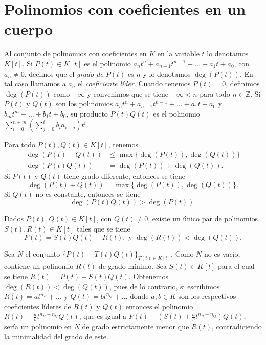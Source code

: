 \section*{Polinomios con coeficientes en un cuerpo}

\begin{defn}
Al conjunto de polinomios con coeficientes en $K$ en la variable $t$ lo denotamos $K[t]$. Si $P(t)\in K[t]$ es el polinomio $a_nt^n+a_{n-1}t^{n-1}+\ldots+a_1t+a_0$, con $a_n\ne 0$, decimos que el \emph{grado de $P(t)$} es $n$ y lo denotamos $\deg\left(P(t)\right)$. En tal caso llamamos a $a_n$ el \emph{coeficiente l\'ider}. Cuando tenemos $P(t)=0$, definimos $\deg\left(P(t)\right)$ como $-\infty$ y convenimos que se tiene $-\infty<n$ para todo $n\in\mathbb{Z}$. Si $P(t)$ y $Q(t)$ son los polinomios $a_nt^n+a_{n-1}t^{n-1}+\ldots+a_1t+a_0$ y $b_mt^m+\ldots+b_1t+b_0$, su producto $P(t)Q(t)$ es el polinomio $\sum_{i=0}^{n+m}\left(\sum_{j=0}^{i}b_ia_{i-j}\right)t^i$.
\end{defn}

\begin{obs}
Para todo $P(t),Q(t)\in K[t]$, tenemos
\begin{align*}
\deg\left(P(t)+Q(t)\right) &  \le \max\{\deg\left(P(t)\right),\deg\left(Q(t)\right)\}\\
\deg\left(P(t)Q(t)\right) & = \deg(P(t))+\deg(Q(t)).
\end{align*}
Si $P(t)$ y $Q(t)$ tiene grado diferente, entonces se tiene
\[
\deg\left(P(t)+Q(t)\right)=\max\{\deg\left(P(t)\right),\deg\left(Q(t)\right)\}.
\]
Si $Q(t)$ no es constante, entonces se tiene
\[
\deg\left(P(t)Q(t)\right) >\deg\left(P(t)\right).
\]
\end{obs}

\begin{teo}
Dados $P(t),Q(t)\in K[t]$, con $Q(t)\ne 0$, existe un \'unico par de polinomios $S(t),R(t)\in K[t]$ tales que se tiene
\[
P(t)=S(t)Q(t)+R(t),\textrm{ y } \deg\left(R(t)\right)<\deg\left(Q(t)\right).
\]
\end{teo}

\dem Sea $N$ el conjunto $\{P(t)-T(t)Q(t)\}_{T(t)\in K[t]}$. Como $N$ no es vacio, contiene un polinomio $R(t)$ de grado m\'inimo. Sea $S(t)\in K[t]$ para el cual se tiene $R(t)=P(t)-S(t)Q(t)$. Obtenemos $\deg\left(R(t)\right)<\deg\left(Q(t)\right)$, pues de lo contrario, si escribimos
$R(t)=at^{n_R}+\ldots$ y $Q(t)=bt^{n_Q}+\ldots$ donde $a,b\in K$ son los respectivos coeficientes l\'ideres de $R(t)$ y $Q(t)$ entonces el polinomio $R(t)-\frac{a}{b}t^{n_R-n_Q}Q(t)$, que es igual a $P(t)-\left(S(t)+\frac{a}{b}t^{n_R-n_Q}\right)Q(t)$, ser\'ia un polinomio en $N$ de grado estrictamente menor que $R(t)$, contradiciendo la minimalidad del grado de este.

